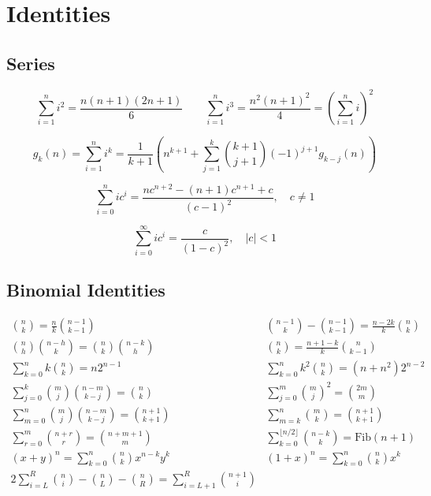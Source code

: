 \section{Identities}

\subsection{Series}

$$\sum_{i=1}^{n} i^{2} = \frac{n(n+1)(2n+1)}{6}  \qquad  \sum_{i=1}^{n} i^{3} = \frac{n^{2}(n+1)^{2}}{4} = \left(\sum_{i=1}^n i\right)^2$$

$$ g_k(n) = \sum_{i=1}^n i^k = \frac{1}{k+1} \left( n^{k+1} + \sum_{j=1}^k \binom{k+1}{j+1} (-1)^{j+1} g_{k-j}(n) \right) $$

$$\sum_{i=0}^{n} ic^{i} = \frac{nc^{n+2} - (n+1)c^{n+1} + c}{(c-1)^{2}}, \quad c \neq 1$$

$$\sum_{i=0}^{\infty} ic^{i} = \frac{c}{(1-c)^{2}}, \quad |c| < 1$$

\subsection{Binomial Identities}

\bigskip

$$
\begin{array}{cc}
\binom{n}{k} = \frac{n}{k}\binom{n-1}{k-1}
&
\binom{n-1}{k} - \binom{n-1}{k-1} = \frac{n - 2k}{k} \binom{n}{k}
\\[10pt]
\binom{n}{h}\binom{n-h}{k} = \binom{n}{k}\binom{n-k}{h} &
\binom{n}{k} = \frac{n+1-k}{k} \binom{n}{k-1}
\\[10pt]
\sum_{k = 0}^n k\binom{n}{k} = n 2^{n-1} &
\sum_{k = 0}^n k^2 \binom{n}{k} = (n + n^2)2^{n-2}
\\[10pt]
\sum_{j = 0}^k\binom{m}{j} \binom{n-m}{k-j} = \binom{n}{k} &
\sum_{j = 0}^m \binom{m}{j}^2 = \binom{2m}{m}
\\[10pt]
\sum_{m = 0}^n \binom{m}{j} \binom{n-m}{k-j} = \binom{n+1}{k+1} &
\sum_{m = k}^n \binom{m}{k} = \binom{n+1}{k+1}
\\[10pt]
\sum_{r = 0}^m \binom{n+r}{r} = \binom{n+m+1}{m} &
\sum_{k=0}^{\lfloor n/2 \rfloor} \binom{n-k}{k} = \text{Fib}(n+1)
\\[10pt]
(x + y)^{n} = \sum_{k=0}^{n} \binom{n}{k} x^{n-k} y^{k} &
(1 + x)^{n} = \sum_{k=0}^{n} \binom{n}{k} x^{k}
\\[10pt]
2\sum_{i = L}^R \binom{n}{i} - \binom{n}{L} - \binom{n}{R} = \sum_{i = L+1}^R \binom{n+1}{i}
\end{array}
$$

